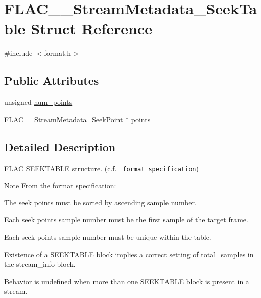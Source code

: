 \hypertarget{struct_f_l_a_c_____stream_metadata___seek_table}{}\section{F\+L\+A\+C\+\_\+\+\_\+\+Stream\+Metadata\+\_\+\+Seek\+Table Struct Reference}
\label{struct_f_l_a_c_____stream_metadata___seek_table}


{\ttfamily \#include $<$format.\+h$>$}

\subsection*{Public Attributes}
\begin{DoxyCompactItemize}
\item 
unsigned \mbox{\hyperlink{struct_f_l_a_c_____stream_metadata___seek_table_a12dcdb596297c199fe6cffa27a64e69f}{num\+\_\+points}}
\item 
\mbox{\hyperlink{struct_f_l_a_c_____stream_metadata___seek_point}{F\+L\+A\+C\+\_\+\+\_\+\+Stream\+Metadata\+\_\+\+Seek\+Point}} $\ast$ \mbox{\hyperlink{struct_f_l_a_c_____stream_metadata___seek_table_a0bf04ada03ea708dba9d31cd6c6159b8}{points}}
\end{DoxyCompactItemize}


\subsection{Detailed Description}
F\+L\+AC S\+E\+E\+K\+T\+A\+B\+LE structure. (c.\+f. \href{../format.html\#metadata_block_seektable}{\texttt{ format specification}})

\begin{DoxyNote}{Note}
From the format specification\+:
\begin{DoxyItemize}
\item The seek points must be sorted by ascending sample number.
\item Each seek point\textquotesingle{}s sample number must be the first sample of the target frame.
\item Each seek point\textquotesingle{}s sample number must be unique within the table.
\item Existence of a S\+E\+E\+K\+T\+A\+B\+LE block implies a correct setting of total\+\_\+samples in the stream\+\_\+info block.
\item Behavior is undefined when more than one S\+E\+E\+K\+T\+A\+B\+LE block is present in a stream. 
\end{DoxyItemize}
\end{DoxyNote}


